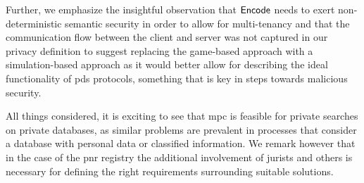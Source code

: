 Further, we emphasize the insightful observation that $ \mathsf{{Encode}} $ needs to exert non-deterministic semantic security in order to allow for multi-tenancy and that the communication flow between the client and server was not captured in our privacy definition to suggest replacing the game-based approach with a simulation-based approach as it would better allow for describing the ideal functionality of \acrshort{pds} protocols, something that is key in steps towards malicious security.

All things considered, it is exciting to see that \acrshort{mpc} is feasible for private searches on private databases, as similar problems are prevalent in processes that consider a database with personal data or classified information. We remark however that in the case of the \acrshort{pnr} registry the additional involvement of jurists and others is necessary for defining the right requirements surrounding suitable solutions.
